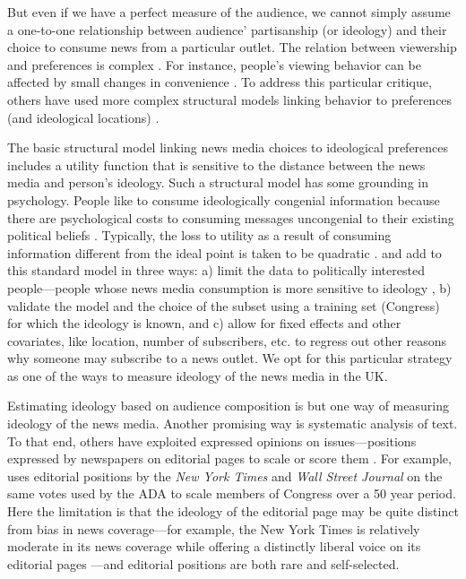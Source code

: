 \documentclass[12pt, letterpaper]{article}
\begin{document}
But even if we have a perfect measure of the audience, we cannot simply assume a one-to-one relationship between audience' partisanship (or ideology) and their choice to consume news from a particular outlet. The relation between viewership and preferences is complex \citep{sood2016}. For instance, people's viewing behavior can be affected by small changes in convenience \citep{martin2014}. To address this particular critique, others have used more complex structural models linking behavior to preferences (and ideological locations) \citep{gentzkow2011, barbera2016}.

The basic structural model linking news media choices to ideological preferences includes a utility function that is sensitive to the distance between the news media and person's ideology. Such a structural model has some grounding in psychology. People like to consume ideologically congenial information because there are psychological costs to consuming messages uncongenial to their existing political beliefs \citet{festinger1957}. Typically, the loss to utility as a result of consuming information different from the ideal point is taken to be quadratic \citep[see, for e.g.,][]{gentzkow2011}. \citet{barbera2015} and \citet{barbera2016} add to this standard model in three ways: a) limit the data to politically interested people---people whose news media consumption is more sensitive to ideology \citep{iyengar2009}, b) validate the model and the choice of the subset using a training set (Congress) for which the ideology is known, and c) allow for fixed effects and other covariates, like location, number of subscribers, etc. to regress out other reasons why someone may subscribe to a news outlet. We opt for this particular strategy as one of the ways to measure ideology of the news media in the UK.

Estimating ideology based on audience composition is but one way of measuring ideology of the news media. Another promising way is systematic analysis of text. To that end, others have exploited expressed opinions on issues---positions expressed by newspapers on editorial pages to scale or score them \citep{ho2008,puglisi2011,puglisi2015}. For example, \citep{habel2012} uses editorial positions by the \emph{New York Times} and \emph{Wall Street Journal} on the same votes used by the ADA to scale members of Congress over a 50 year period. Here the limitation is that the ideology of the editorial page may be quite distinct from bias in news coverage---for example, the New York Times is relatively moderate in its news coverage \citep{gentzkow2010} while offering a distinctly liberal voice on its editorial pages \citep{habel2012}---and editorial positions are both rare and self-selected.
\end{document}
